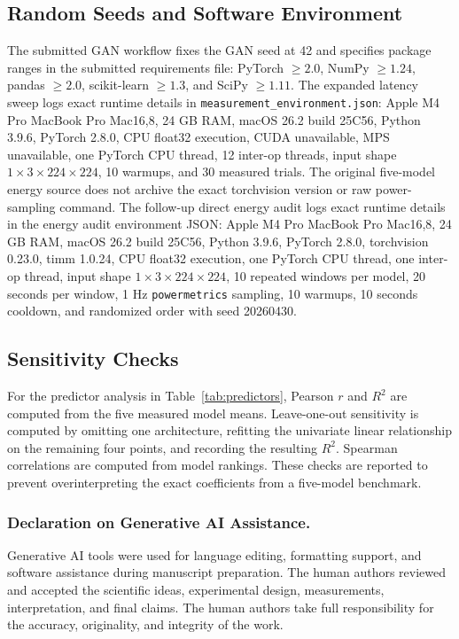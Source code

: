 \documentclass{svproc}
\begin{document}
\subsection{Random Seeds and Software Environment}
The submitted GAN workflow fixes the GAN seed at 42 and specifies package
ranges in the submitted requirements file: PyTorch $\geq 2.0$, NumPy
$\geq 1.24$, pandas $\geq 2.0$, scikit-learn $\geq 1.3$, and SciPy
$\geq 1.11$. The expanded latency sweep logs exact runtime details in
\texttt{measurement\_environment.json}: Apple M4 Pro MacBook Pro Mac16,8,
24 GB RAM, macOS 26.2 build 25C56, Python 3.9.6, PyTorch 2.8.0, CPU float32
execution, CUDA unavailable, MPS unavailable, one PyTorch CPU thread, 12
inter-op threads, input shape $1 \times 3 \times 224 \times 224$, 10 warmups,
and 30 measured trials. The original five-model energy source does not archive
the exact torchvision version or raw power-sampling command. The follow-up
direct energy audit logs exact runtime details in the energy audit environment
JSON: Apple M4 Pro MacBook Pro Mac16,8, 24 GB RAM, macOS 26.2 build
25C56, Python 3.9.6, PyTorch 2.8.0, torchvision 0.23.0, timm 1.0.24, CPU
float32 execution, one PyTorch CPU thread, one inter-op thread, input shape
$1 \times 3 \times 224 \times 224$, 10 repeated windows per model, 20 seconds
per window, 1 Hz \texttt{powermetrics} sampling, 10 warmups, 10 seconds
cooldown, and randomized order with seed 20260430.

\subsection{Sensitivity Checks}
For the predictor analysis in Table~\ref{tab:predictors}, Pearson $r$ and
$R^2$ are computed from the five measured model means. Leave-one-out
sensitivity is computed by omitting one architecture, refitting the univariate
linear relationship on the remaining four points, and recording the resulting
$R^2$. Spearman correlations are computed from model rankings. These checks
are reported to prevent overinterpreting the exact coefficients from a
five-model benchmark.


\subsubsection{Declaration on Generative AI Assistance.}
\begin{sloppypar}
Generative AI tools were used for language editing, formatting support, and
software assistance during manuscript preparation. The human authors reviewed
and accepted the scientific ideas, experimental design, measurements,
interpretation, and final claims. The human authors take full responsibility
for the accuracy, originality, and integrity of the work.
\end{sloppypar}
\end{document}
